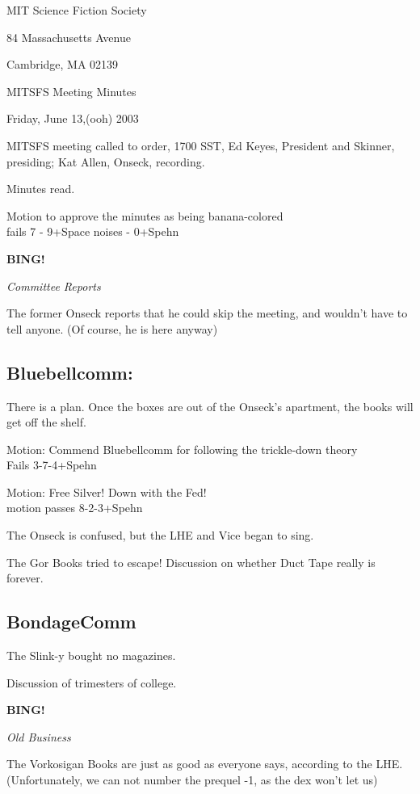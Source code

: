 \documentclass[12pt]{article}
\newcommand{\bing}{{\bf BING!} }
\newcommand{\goto}[1]{\bing \vskip 12pt \centerline{{\em{#1}}}}
\begin{document}
\begin{center}

MIT Science Fiction Society 

84 Massachusetts Avenue

Cambridge, MA 02139

\vspace{12pt}

MITSFS Meeting Minutes 

Friday, June 13,(ooh) 2003

\end{center}
 
\vspace{18pt}

\setlength{\parskip}{6pt}

\noindent
MITSFS meeting called to order, 1700 SST, Ed Keyes, President and
Skinner, presiding; Kat Allen,  Onseck, recording.

Minutes read.

Motion to approve the minutes as being banana-colored\\
fails 7 - 9+Space noises - 0+Spehn

\goto{Committee Reports}
The former Onseck reports that he could skip the meeting, and wouldn't
have to tell anyone. (Of course, he is here anyway)

\subsection*{Bluebellcomm:} There is a plan. Once the boxes are out of the Onseck's
apartment, the books will get off the shelf.

Motion:  Commend Bluebellcomm for following the trickle-down theory\\
Fails 3-7-4+Spehn

Motion: Free Silver! Down with the Fed!\\
motion passes 8-2-3+Spehn

The Onseck is confused, but the LHE and Vice began to sing.

The Gor Books tried to escape! Discussion on whether Duct Tape really
is forever.

\subsection*{BondageComm}
The Slink-y bought no magazines.

Discussion of trimesters of college.

\goto{Old Business}
The Vorkosigan Books are just as good as everyone says, according to
the LHE. (Unfortunately, we can not number the prequel -1, as the dex
won't let us)
\end{document}
